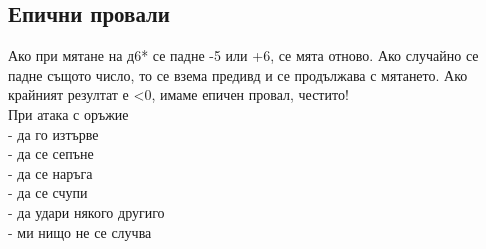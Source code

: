 \subsection{Епични провали}
Ако при мятане на д6* се падне -5 или +6, се мята отново.
Ако случайно се падне същото число, то се взема предивд и се продължава с мятането.
Ако крайният резултат е <0, имаме епичен провал, честито!  \\

При атака с оръжие           \\
- да го изтърве              \\
- да се сепъне               \\
- да се наръга               \\
- да се счупи                \\
- да удари някого другиго    \\
- ми нищо не се случва       \\
